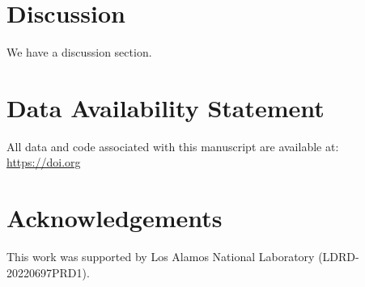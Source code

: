 \documentclass{article}
\begin{document}
\section{Discussion}

We have a discussion section.

\section{Data Availability Statement}

All data and code associated with this manuscript are available at: \href{https://doi.org}{https://doi.org}

\section{Acknowledgements}

This work was supported by Los Alamos National Laboratory (LDRD-20220697PRD1).



\end{document}
